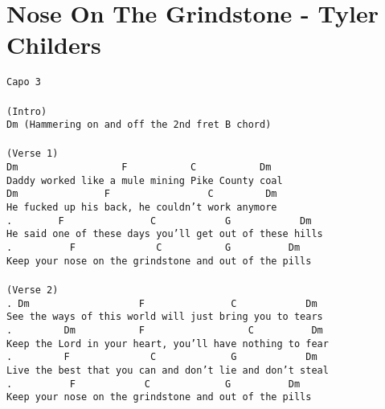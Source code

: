 \newpage
\section{Nose On The Grindstone - Tyler Childers}
\label{Nose On The Grindstone - Tyler Childers}
\texttt{Capo\ 3\\
\\
(Intro)\\
Dm\ (Hammering\ on\ and\ off\ the\ 2nd\ fret\ B\ chord)\\
\\
(Verse\ 1)\\
Dm\ \ \ \ \ \ \ \ \ \ \ \ \ \ \ \ \ \ F\ \ \ \ \ \ \ \ \ \ \ C\ \ \ \ \ \ \ \ \ \ \ Dm\\
Daddy\ worked\ like\ a\ mule\ mining\ Pike\ County\ coal\\
Dm\ \ \ \ \ \ \ \ \ \ \ \ \ \ \ F\ \ \ \ \ \ \ \ \ \ \ \ \ \ \ \ \ C\ \ \ \ \ \ \ \ \ Dm\\
He\ fucked\ up\ his\ back,\ he\ couldn't\ work\ anymore\\
.\ \ \ \ \ \ \ \ F\ \ \ \ \ \ \ \ \ \ \ \ \ \ \ C\ \ \ \ \ \ \ \ \ \ \ \ G\ \ \ \ \ \ \ \ \ \ \ \ Dm\\
He\ said\ one\ of\ these\ days\ you'll\ get\ out\ of\ these\ hills\\
.\ \ \ \ \ \ \ \ \ \ F\ \ \ \ \ \ \ \ \ \ \ \ \ \ C\ \ \ \ \ \ \ \ \ \ \ G\ \ \ \ \ \ \ \ \ \ Dm\\
Keep\ your\ nose\ on\ the\ grindstone\ and\ out\ of\ the\ pills\\
\\
(Verse\ 2)\\
.\ Dm\ \ \ \ \ \ \ \ \ \ \ \ \ \ \ \ \ \ \ F\ \ \ \ \ \ \ \ \ \ \ \ \ \ \ C\ \ \ \ \ \ \ \ \ \ \ \ Dm\\
See\ the\ ways\ of\ this\ world\ will\ just\ bring\ you\ to\ tears\\
.\ \ \ \ \ \ \ \ \ Dm\ \ \ \ \ \ \ \ \ \ \ F\ \ \ \ \ \ \ \ \ \ \ \ \ \ \ \ \ \ C\ \ \ \ \ \ \ \ \ \ Dm\\
Keep\ the\ Lord\ in\ your\ heart,\ you'll\ have\ nothing\ to\ fear\\
.\ \ \ \ \ \ \ \ \ F\ \ \ \ \ \ \ \ \ \ \ \ \ \ C\ \ \ \ \ \ \ \ \ \ \ \ \ G\ \ \ \ \ \ \ \ \ \ \ \ Dm\\
Live\ the\ best\ that\ you\ can\ and\ don't\ lie\ and\ don't\ steal\\
.\ \ \ \ \ \ \ \ \ \ F\ \ \ \ \ \ \ \ \ \ \ \ C\ \ \ \ \ \ \ \ \ \ \ \ \ G\ \ \ \ \ \ \ \ \ \ Dm\\
Keep\ your\ nose\ on\ the\ grindstone\ and\ out\ of\ the\ pills\\
}
